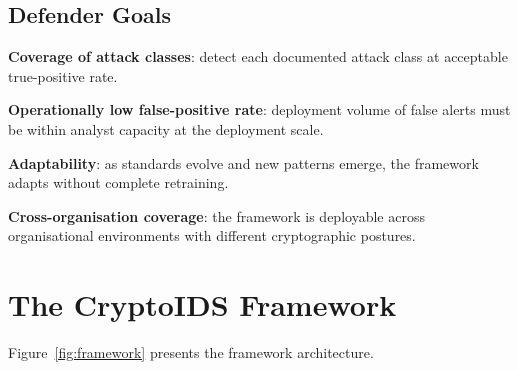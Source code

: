 \documentclass[sigconf,nonacm]{acmart}
\begin{document}
\subsection{Defender Goals}

\textbf{Coverage of attack classes}: detect each documented
attack class at acceptable true-positive rate.

\textbf{Operationally low false-positive rate}: deployment volume
of false alerts must be within analyst capacity at the deployment
scale.

\textbf{Adaptability}: as standards evolve and new patterns
emerge, the framework adapts without complete retraining.

\textbf{Cross-organisation coverage}: the framework is deployable
across organisational environments with different cryptographic
postures.

\section{The CryptoIDS Framework}

Figure~\ref{fig:framework} presents the framework architecture.
\end{document}
